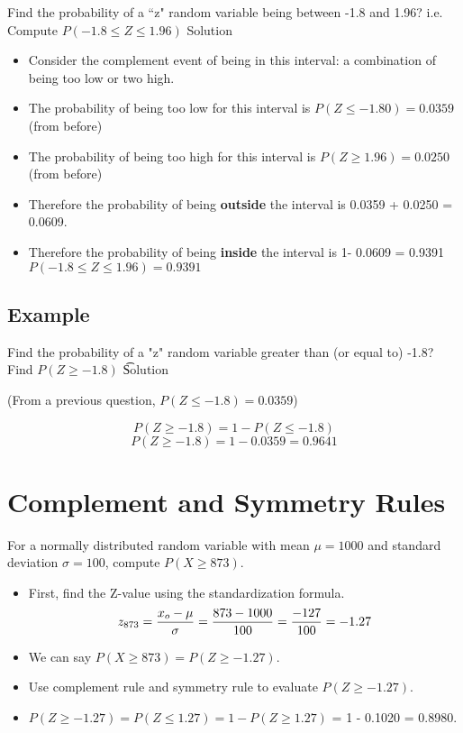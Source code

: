 \documentclass[]{report}
\begin{document}
Find the probability of a ``z" random variable being between -1.8 and 1.96?
i.e. Compute $P(-1.8 \leq Z \leq 1.96)$
Solution
\begin{itemize}
\item Consider the complement event of being in this interval: a combination of being too low or two high.
\item
The probability of being too low for this interval is $P(Z \leq -1.80) = 0.0359$ (from before)
\item
The probability of being too high for this interval is $P(Z \geq 1.96) = 0.0250$ (from before)
\item
Therefore the probability of being \textbf{outside} the interval is 0.0359 + 0.0250 = 0.0609.
\item
Therefore the probability of being \textbf{inside} the interval is 1- 0.0609 = 0.9391
$P(-1.8 \leq Z \leq 1.96) = 0.9391$
\end{itemize}


\subsection{Example }
Find the probability of a "z" random variable greater than (or equal to) -1.8?
Find  $P(Z \geq -1.8)$
\noindent \t{Solution }

(From a previous question, $P(Z \leq -1.8) = 0.0359$)

\[P(Z \geq -1.8) = 1 - P(Z \leq -1.8) \]
\[P(Z \geq -1.8)= 1 - 0.0359 = 0.9641\]


\section{Complement and Symmetry Rules}

For a normally distributed random variable with mean $\mu = 1000$ and standard deviation $\sigma = 100$, compute $P(X \geq 873)$.

\begin{itemize} \item First, find the Z-value using the standardization formula.
\[
z_{873} = {x_o - \mu \over \sigma} = {873 - 1000 \over 100} = {-127 \over 100} = -1.27
\]
\item We can say $P(X \geq 873) = P(Z \geq -1.27)$.
\item Use complement rule and symmetry rule to evaluate  $P(Z \geq -1.27)$.
\item $ P(Z \geq -1.27) = P(Z \leq 1.27) = 1 - P(Z \geq 1.27) $  = 1 - 0.1020 = {0.8980}.
\end{itemize}
\end{document}

